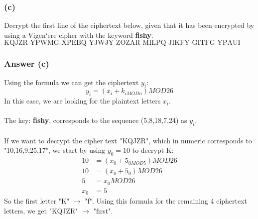 \documentclass{article}
\begin{document}
	\subsubsection*{(c)}
	Decrypt the first line of the ciphertext below, given that it has been encrypted by
	using a Vigen`ere cipher with the keyword \textbf{fishy}.
	$$
	\text{KQJZR YPWMG XPEBQ YJWJY ZOZAR MILPQ JIKFY GITFG YPAUI HWMSB MINLA FCYOR}
	$$
	
	\subsubsection*{Answer (c)}
	Using the formula we can get the ciphertext $y_i$:
	$$
	y_i = (x_i + k_{i MOD n}) MOD 26
	$$
	In this case, we are looking for the plaintext letters $x_i$.
	\\\\
	The key: \textbf{fishy}, corresponds to the sequence (5,8,18,7,24) as $y_i$. 
	\\\\
	If we want to decrypt the cipher text "KQJZR", which in numeric corresponds to "10,16,9,25,17", we start by using $y_0 = 10$ to decrypt K:
	\[
	\begin{split}
	10 	&= (x_0 + 5_{0 MOD 5}) MOD 26 \\
	10	&= (x_0 + 5_0) MOD 26 \\
	5	&= x_0 MOD 26 \\
	x_0 &= 5
	\end{split}
	\]
	So the first letter "K" $\rightarrow$ "f". Using this formula for the remaining 4 ciphertext letters, we get "KQJZR" $\rightarrow$ "first".
	
	
\end{document}
